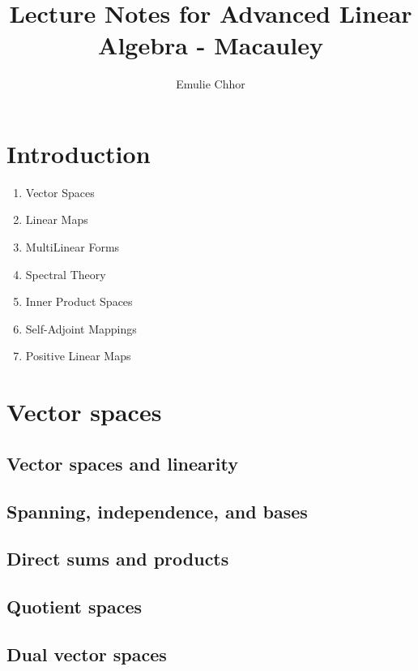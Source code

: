 \documentclass{article}
\begin{document}
\title{Lecture Notes for Advanced Linear Algebra - Macauley}
\author{Emulie Chhor}
\maketitle

\section{Introduction}

\begin{enumerate}
    \item Vector Spaces
    \item Linear Maps
    \item MultiLinear Forms
    \item Spectral Theory
    \item Inner Product Spaces
    \item Self-Adjoint Mappings
    \item Positive Linear Maps
\end{enumerate}

\newtheorem{definition}{Definition}[subsection]
\newtheorem{theorem}{Theorem}[subsection]
\newtheorem{corollary}{Corollary}[subsection]
\newtheorem{lemma}[theorem]{Lemma}
\newtheorem{proposition}{Proposition}[section]
\newtheorem{axiom}{Axiome}
\newtheorem{property}{Propriété}[subsection]
\newtheorem*{remark}{Remarque}
\newtheorem*{problem}{Problème}
\newtheorem*{intuition}{Intuition}

\section{Vector spaces}
\subsection{Vector spaces and linearity}
\subsection{Spanning, independence, and bases}
\subsection{Direct sums and products}
\subsection{Quotient spaces}
\subsection{Dual vector spaces}
\end{document}
